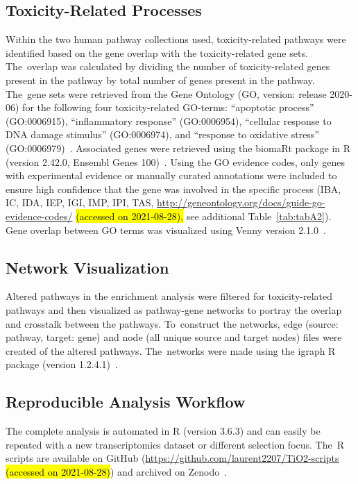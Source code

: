 \documentclass[ijms,article,accept,moreauthors,pdftex]{Definitions/mdpi}
\begin{document}
\begin{paracol}{2}
\subsection{Toxicity-Related Processes}
Within the two human pathway collections used, toxicity-related pathways were identified based on the gene overlap with the toxicity-related gene sets. The~overlap was calculated by dividing the number of toxicity-related genes present in the pathway by total number of genes present in the pathway. The~gene sets were retrieved from the Gene Ontology (GO, version: release 2020-06) for the following four toxicity-related GO-terms: “apoptotic process” (GO:0006915), “inflammatory response” (GO:0006954), “cellular response to DNA damage stimulus” (GO:0006974), and “response to oxidative stress” (GO:0006979)~\cite{Ashburner2000,Carbon2020}. Associated genes were retrieved using the biomaRt package in R (version 2.42.0, Ensembl Genes 100)~\cite{Durinck2005,Durinck2009}. Using the GO evidence codes, only genes with experimental evidence or manually curated annotations were included to ensure high confidence that the gene was involved in the specific process (IBA, IC, IDA, IEP, IGI, IMP, IPI, TAS, \url{http://geneontology.org/docs/guide-go-evidence-codes/} \hl{(accessed on 2021-08-28),}
see additional Table~\ref{tab:tabA2}). Gene overlap between GO terms was visualized using Venny version 2.1.0~\cite{Venny}. 

\subsection{Network Visualization}
Altered pathways in the enrichment analysis were filtered for toxicity-related pathways and then visualized as pathway-gene networks to portray the overlap and crosstalk between the pathways. To~construct the networks, edge (source: pathway, target: gene) and node (all unique source and target nodes) files were created of the altered pathways. The~networks were made using the igraph R package (version 1.2.4.1)~\cite{Csardi2006}.

\subsection{Reproducible Analysis Workflow}
The complete analysis is automated in R (version 3.6.3) and can easily be repeated with a new transcriptomics dataset or different selection focus. The~R scripts are available on GitHub (\url{https://github.com/laurent2207/TiO2-scripts} \hl{(accessed on 2021-08-28)}) and archived on Zenodo~\cite{TiO2-scripts}.


\end{paracol}
\end{document}
